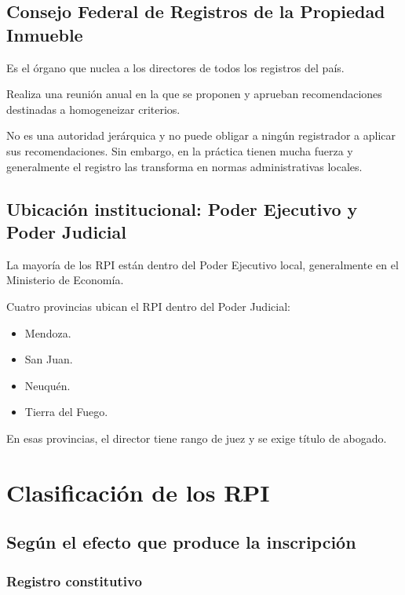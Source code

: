 \documentclass[12pt]{book}
\begin{document}
\subsection{Consejo Federal de Registros de la Propiedad Inmueble}

Es el \'organo que nuclea a los directores de todos los registros del pa\'is.

Realiza una reuni\'on anual en la que se proponen y aprueban recomendaciones destinadas a homogeneizar criterios.

No es una autoridad jer\'arquica y no puede obligar a ning\'un registrador a aplicar sus recomendaciones. Sin embargo, en la pr\'actica tienen mucha fuerza y generalmente el registro las transforma en normas administrativas locales.

\subsection{Ubicaci\'on institucional: Poder Ejecutivo y Poder Judicial}

La mayor\'ia de los RPI est\'an dentro del Poder Ejecutivo local, generalmente en el Ministerio de Econom\'ia.

Cuatro provincias ubican el RPI dentro del Poder Judicial:

\begin{itemize}
    \item Mendoza.
    \item San Juan.
    \item Neuqu\'en.
    \item Tierra del Fuego.
\end{itemize}

En esas provincias, el director tiene rango de juez y se exige t\'itulo de abogado.

\section{Clasificaci\'on de los RPI}

\subsection{Seg\'un el efecto que produce la inscripci\'on}

\subsubsection{Registro constitutivo}
\end{document}
